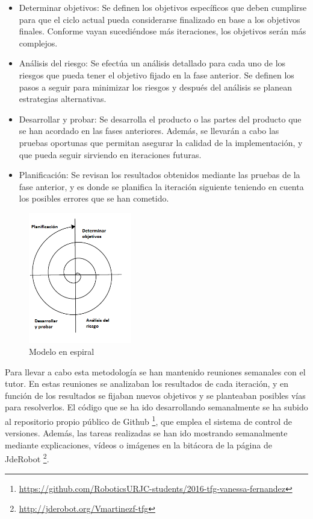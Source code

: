 \begin{itemize}
\item Determinar objetivos: Se definen los objetivos específicos que deben cumplirse para que el ciclo actual pueda considerarse finalizado en base a los objetivos finales. Conforme vayan sucediéndose más iteraciones, los objetivos serán más complejos.
\item Análisis del riesgo: Se efectúa un análisis detallado para cada uno de los riesgos que pueda tener el objetivo fijado en la fase anterior. Se definen los pasos a seguir para minimizar los riesgos y después del análisis se planean estrategias alternativas.
\item Desarrollar y probar: Se desarrolla el producto o las partes del producto que se han acordado en las fases anteriores. Además, se llevarán a cabo las pruebas oportunas que permitan asegurar la calidad de la implementación, y que pueda seguir sirviendo en iteraciones futuras.
\item Planificación: Se revisan los resultados obtenidos mediante las pruebas de la fase anterior, y es donde se planifica la iteración siguiente teniendo en cuenta los posibles errores que se han cometido.
\end{itemize}

\begin{figure}[H]
  \begin{center}
    \includegraphics[width=0.4\textwidth]{figures/Objetivos/espiral.png}
		\caption{Modelo en espiral}
		\label{fig.espiral}
		\end{center}
\end{figure}

Para llevar a cabo esta metodología se han mantenido reuniones semanales con el tutor. En estas reuniones se analizaban los resultados de cada iteración, y en función de los resultados se fijaban nuevos objetivos y se planteaban posibles vías para resolverlos. El código que se ha ido desarrollando semanalmente se ha subido al repositorio propio público de Github \footnote{\url{https://github.com/RoboticsURJC-students/2016-tfg-vanessa-fernandez}}, que emplea el sistema de control de versiones. Además, las tareas realizadas se han ido mostrando semanalmente mediante explicaciones, vídeos o imágenes en la bitácora de la página de JdeRobot \footnote{\url{http://jderobot.org/Vmartinezf-tfg}}.\\

